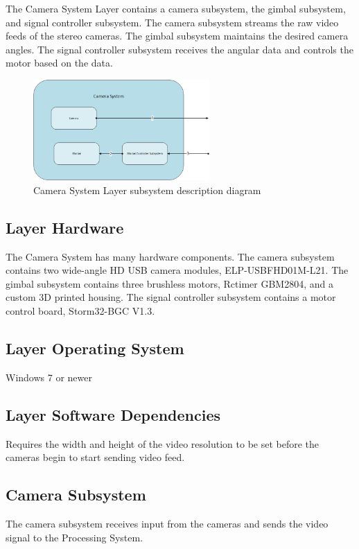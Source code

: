 The Camera System Layer contains a camera subsystem, the gimbal subsystem, and signal controller subsystem. The camera subsystem streams the raw video feeds of the stereo cameras. The gimbal subsystem maintains the desired camera angles. The signal controller subsystem receives the angular data and controls the motor based on the data.

\begin{figure}[h!]
	\centering
 	\includegraphics[width=0.60\textwidth]{images/camerasubsystem}
 \caption{Camera System Layer subsystem description diagram}
\end{figure}

\subsection{Layer Hardware}
The Camera System has many hardware components. The camera subsystem contains two wide-angle HD USB camera modules, ELP-USBFHD01M-L21. The gimbal subsystem contains three brushless motors, Rctimer GBM2804, and a custom 3D printed housing. The signal controller subsystem contains a motor control board, Storm32-BGC V1.3.

\subsection{Layer Operating System}
Windows 7 or newer

\subsection{Layer Software Dependencies}
Requires the width and height of the video resolution to be set before the cameras begin to start sending video feed.

\subsection{Camera Subsystem}
The camera subsystem receives input from the cameras and sends the video signal to the Processing System.

